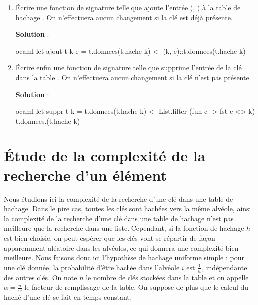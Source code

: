 \documentclass[10pt,a4paper, varwidth]{article}
\begin{document}
\begin{enumerate}
\begin{emphase}
\begin{center}
            \end{center}
        \end{emphase}
        \fi
		\item Écrire une fonction  de signature  telle que  ajoute l'entrée (, ) à la table de hachage . On n'effectuera aucun changement si la clé est déjà présente.
		\if{}
        \begin{emphase}
            \textbf{Solution} : 
            \begin{center}
\begin{code}{ocaml}
let ajout t k e =
    t.donnees(t.hache k) <- (k, e)::t.donnees(t.hache k)
\end{code}
            \end{center}
        \end{emphase}
        \fi
		\item Écrire enfin une fonction  de signature  telle que  supprime l'entrée de la clé  dans la table . On n'effectuera aucun changement si la clé n'est pas présente.
		\if{}
        \begin{emphase}
            \textbf{Solution} : 
            \begin{center}
\begin{code}{ocaml}
let suppr t k =
    t.donnees(t.hache k) <- List.filter (fun c -> fst c <> k) t.donnees.(t.hache k)
\end{code}
            \end{center}
        \end{emphase}
        \fi
	\end{enumerate}
		
	\section{Étude de la complexité de la recherche d'un élément}
	Nous étudions ici la complexité de la recherche d'une clé dans une table de hachage. Dans le pire cas, toutes les
	clés sont hachées vers la même alvéole, ainsi la complexité de la recherche d'une clé dans une table de hachage
	n'est pas meilleure que la recherche dans une liste. Cependant, si la fonction de hachage $h$ est bien choisie, 
    on peut espérer que les clés vont se répartir de façon apparemment aléatoire dans les alvéoles, ce qui donnera une
	complexité bien meilleure.
	Nous faisons donc ici l'hypothèse de hachage uniforme simple : pour une clé donnée, la probabilité d'être hachée
	dans l'alvéole $i$ est $\frac{1}{w}$, indépendante des autres clés. On note $n$ le nombre de clés stockées dans la table et on
	appelle $\alpha = \frac{n}{w}$ le facteur de remplissage de la table. On suppose de plus que le calcul du haché d'une clé se
	fait en temps constant.
	
\end{document}
